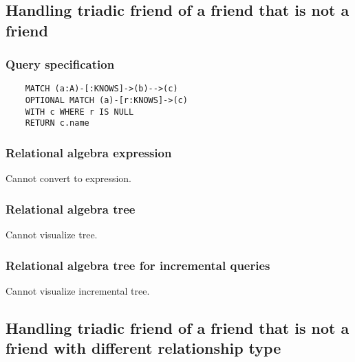 	\subsection{Handling triadic friend of a friend that is not a friend}

	\subsubsection*{Query specification}

	\begin{lstlisting}
	MATCH (a:A)-[:KNOWS]->(b)-->(c)
	OPTIONAL MATCH (a)-[r:KNOWS]->(c)
	WITH c WHERE r IS NULL
	RETURN c.name
	\end{lstlisting}


	\subsubsection*{Relational algebra expression}

	Cannot convert to expression.

	\subsubsection*{Relational algebra tree}

	Cannot visualize tree.

	\subsubsection*{Relational algebra tree for incremental queries}

	Cannot visualize incremental tree.
	\subsection{Handling triadic friend of a friend that is not a friend with different relationship type}


